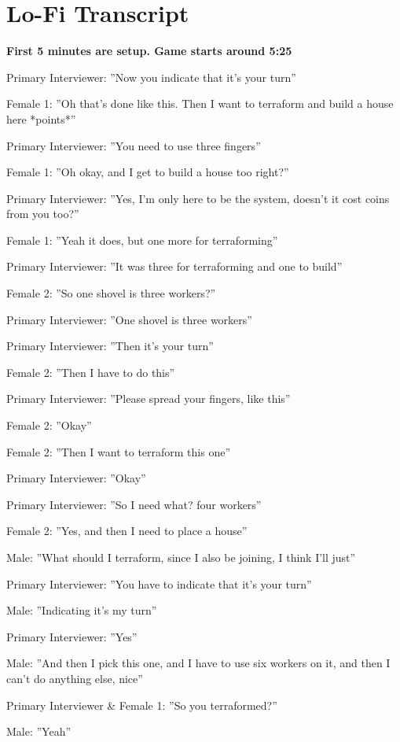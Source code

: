 \chapter{Lo-Fi Transcript}
\label{app:lofitranscript}

\textbf{First 5 minutes are setup. Game starts around 5:25}

Primary Interviewer: ”Now you indicate that it’s your turn”

Female 1: ”Oh that’s done like this. Then I want to terraform and build a house here *points*”

Primary Interviewer: ”You need to use three fingers”

Female 1: ”Oh okay, and I get to build a house too right?”

Primary Interviewer: ”Yes, I’m only here to be the system, doesn’t it cost coins from you too?”

Female 1: ”Yeah it does, but one more for terraforming”

Primary Interviewer: ”It was three for terraforming and one to build”

Female 2: ”So one shovel is three workers?”

Primary Interviewer: ”One shovel is three workers”

Primary Interviewer: ”Then it’s your turn”

Female 2: ”Then I have to do this”

Primary Interviewer: ”Please spread your fingers, like this”

Female 2: ”Okay”

Female 2: ”Then I want to terraform this one”

Primary Interviewer: ”Okay”

Primary Interviewer: ”So I need what? four workers”

Female 2: ”Yes, and then I need to place a house”

Male: ”What should I terraform, since I also be joining, I think I’ll just”

Primary Interviewer: ”You have to indicate that it’s your turn”

Male: ”Indicating it’s my turn”

Primary Interviewer: ”Yes”

Male: ”And then I pick this one, and I have to use six workers on it, and then I can’t do anything else, nice”

Primary Interviewer \& Female 1: ”So you terraformed?”

Male: ”Yeah”

